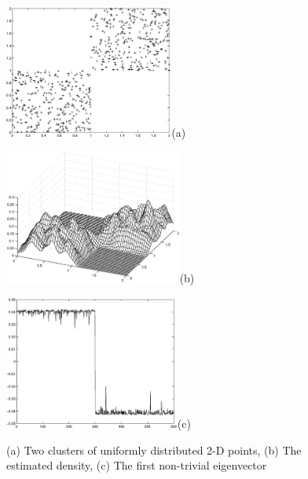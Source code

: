 \documentclass[12pt,letterpaper,doublespaced,ETD,dvips,proposal]{gtthesis}
\begin{document}
\begin{Body}
\begin{figure}[!htb]
 \centerline{\includegraphics[height=4.4cm]{fig1a.eps}(a)}
 \centerline{\includegraphics[height=4.4cm]{fig1b.eps}(b)}
 \centerline{\includegraphics[height=4.4cm]{fig1c.eps}(c)}
 \caption{(a) Two clusters of uniformly distributed 2-D points,
(b) The estimated density, (c) The first non-trivial eigenvector }
  \label{fig1}
\end{figure}



\end{Body}
\end{document}
